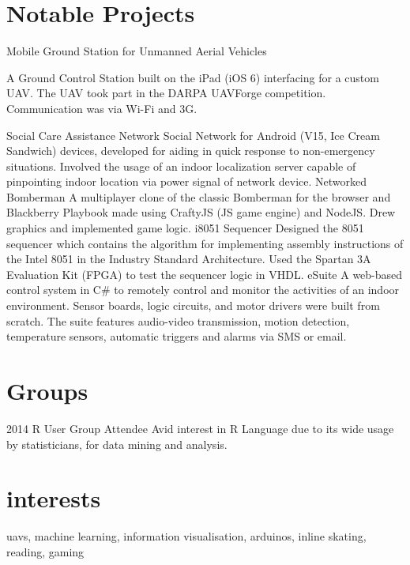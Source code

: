 \documentclass[]{friggeri-cv}
\begin{document}
\section{Notable Projects}
\begin{entrylist}
	{Mobile Ground Station for Unmanned Aerial Vehicles}
	{}
	{
		A Ground Control Station built on the iPad (iOS 6) interfacing for a custom UAV. The UAV took part in the DARPA UAVForge competition. Communication was via Wi-Fi and 3G.

	}
	{Social Care Assistance Network}
	{}
	{Social Network for Android (V15, Ice Cream Sandwich) devices, developed for aiding in quick response to non-emergency situations. Involved the usage of an indoor localization server capable of pinpointing indoor location via power signal of network device.}
	{Networked Bomberman}
	{}
	{A multiplayer clone of the classic Bomberman for the browser and Blackberry Playbook made using CraftyJS (JS game engine) and NodeJS. Drew graphics and implemented game logic. }
	{i8051 Sequencer}
	{}
	{Designed the 8051 sequencer which contains the algorithm for implementing assembly instructions of the Intel 8051 in the Industry Standard Architecture. Used the Spartan 3A Evaluation Kit (FPGA) to test the sequencer logic in VHDL.}
	{eSuite}
	{}
	{A web-based control system in C\# to remotely control and monitor the activities of an indoor environment. Sensor boards, logic circuits, and motor drivers were built from scratch. The suite features audio-video transmission, motion detection, temperature sensors, automatic triggers and alarms via SMS or email.}

\end{entrylist}



\section{Groups}

\begin{entrylist}
	\entry
	{2014}
	{R User Group}
	{Attendee}
	{Avid interest in R Language due to its wide usage by statisticians, for data mining and analysis.}
	
\end{entrylist}
\section{interests}
uavs, machine learning, information visualisation, arduinos, inline skating, reading, gaming
\end{document}
